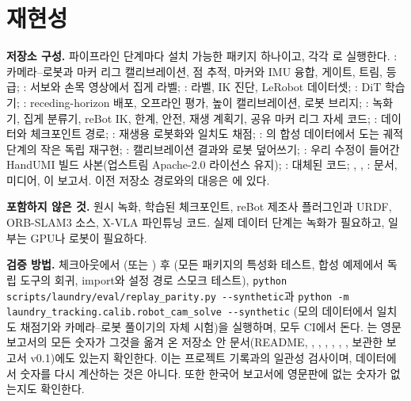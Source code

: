 \documentclass[conference,10pt]{IEEEtran}
\begin{document}
\section{재현성}\label{sec:repro}
\textbf{저장소 구성.} 파이프라인 단계마다 설치 가능한 패키지 하나이고, 각각 로 실행한다.
: 카메라--로봇과 마커 리그 캘리브레이션, 점 추적, 마커와 IMU 융합, 게이트, 트림, 등급;
: 서보와 손목 영상에서 집게 라벨; : 라벨, IK 진단, LeRobot 데이터셋;
: DiT 학습기; : receding-horizon 배포, 오프라인 평가, 높이 캘리브레이션,
로봇 브리지; : 녹화기, 집게 분류기, reBot IK, 한계, 안전, 재생 계획기, 공유 마커 리그 자세 코드;
: 데이터와 체크포인트 경로; : 재생용 로봇화와 일치도 채점;
: 의 합성 데이터에서 도는 궤적 단계의 작은 독립 재구현;
: 캘리브레이션 결과와 로봇 덮어쓰기; : 우리 수정이 들어간 HandUMI 빌드 사본(업스트림
Apache-2.0 라이선스 유지); : 대체된 코드; , , : 문서, 미디어, 이 보고서.
이전 저장소 경로와의 대응은 에 있다.

\textbf{포함하지 않은 것.} 원시 녹화, 학습된 체크포인트, reBot 제조사 플러그인과 URDF, ORB-SLAM3 소스, X-VLA 파인튜닝 코드. 실제
데이터 단계는 녹화가 필요하고, 일부는 GPU나 로봇이 필요하다.

\textbf{검증 방법.} 체크아웃에서 (또는 ) 후 (모든 패키지의
특성화 테스트, 합성 예제에서 독립 도구의 회귀, import와 설정 경로 스모크 테스트), \texttt{python scripts/laundry/eval/replay\_parity.py -\/-synthetic}과
\texttt{python -m laundry\_tracking.calib.robot\_cam\_solve -\/-synthetic}
(모의 데이터에서 일치도 채점기와 카메라--로봇 풀이기의 자체 시험)을 실행하며, 모두 CI에서 돈다. 는
영문 보고서의 모든 숫자가 그것을 옮겨 온 저장소 안 문서(README, , , , ,
, , 보관한 보고서 v0.1)에도 있는지 확인한다. 이는 프로젝트 기록과의 일관성 검사이며, 데이터에서 숫자를
다시 계산하는 것은 아니다. 또한 한국어
보고서에 영문판에 없는 숫자가 없는지도 확인한다.
\end{document}
